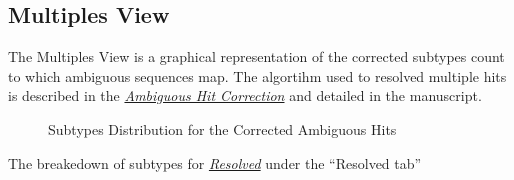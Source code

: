 \documentclass[letterpaper,10pt,english]{sphinxmanual}
\begin{document}
\subsection{Multiples View}
\label{Web:multiples-view}
The Multiples View is a graphical representation of the corrected subtypes
count to which ambiguous sequences map. The algortihm used to
resolved multiple hits is described in the {\hyperref[defs:multiple-hits]{\emph{Ambiguous Hit Correction}}} and
detailed in the manuscript.
\begin{figure}[htbp]
\centering
\capstart

\caption{Subtypes Distribution for the Corrected Ambiguous Hits}\end{figure}

The breakedown of subtypes for {\hyperref[defs:resolved]{\emph{Resolved}}} under the ``Resolved tab''
\end{document}
